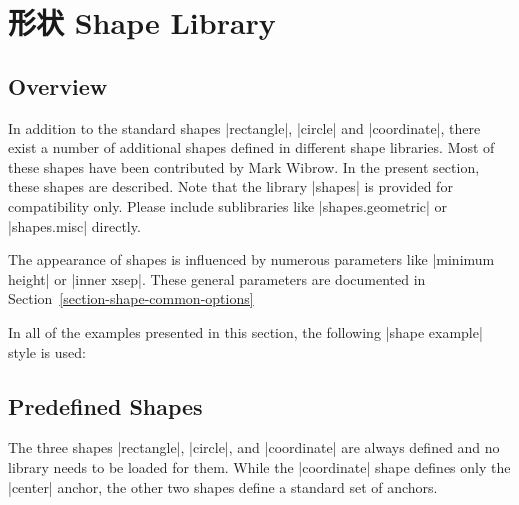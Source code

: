 %
%
%


\section{形状 Shape Library}
\label{section-libs-shapes}

\subsection{Overview}

In addition to the standard shapes |rectangle|, |circle| and |coordinate|,
there exist a number of additional shapes defined in different shape libraries.
Most of these shapes have been contributed by Mark Wibrow. In the present
section, these shapes are described. Note that the library |shapes| is provided
for compatibility only. Please include sublibraries like |shapes.geometric| or
|shapes.misc| directly.

The appearance of shapes is influenced by numerous parameters like
|minimum height| or |inner xsep|. These general parameters are documented in
Section~\ref{section-shape-common-options}

In all of the examples presented in this section, the following |shape example|
style is used:
%
\begin{codeexample}
\end{codeexample}


\subsection{Predefined Shapes}
\label{section-predefined-shapes}

The three shapes |rectangle|, |circle|, and |coordinate| are always defined and
no library needs to be loaded for them. While the |coordinate| shape defines
only the |center| anchor, the other two shapes define a standard set of
anchors.

